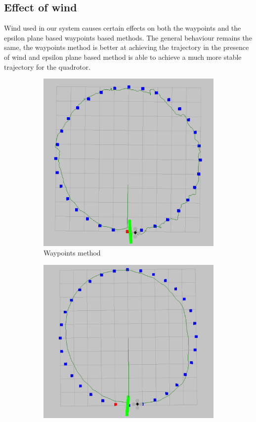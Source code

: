 \documentclass[hidelinks,BTech]{iitmdiss}
\begin{document}
\subsection*{Effect of wind}
Wind used in our system causes certain effects on both the waypoints and the epsilon plane based waypoints based methods. The general behaviour remains the same, the waypoints method is better at achieving the trajectory in the presence of wind and epsilon plane based method is able to achieve a much more stable trajectory for the quadrotor.
\begin{figure}[H]
  \centering
  \begin{subfigure}[t]{0.45\textwidth}
    \centering
      \includegraphics[width=\textwidth]{Waypoints_wind.png}
      \caption{Waypoints method}
  \end{subfigure}
  \begin{subfigure}[t]{0.49\textwidth}
    \centering
      \includegraphics[width=\textwidth]{Waypoints_0_9_wind.png}

\end{subfigure}
\end{figure}
\end{document}
